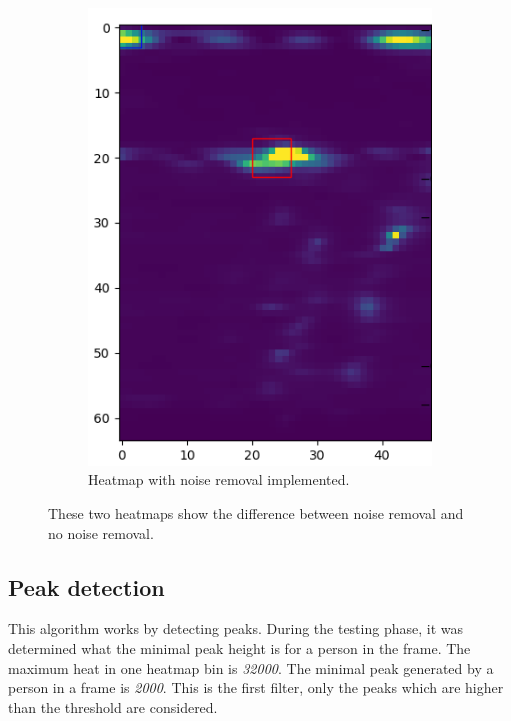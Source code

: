 \begin{figure}[t]
\begin{subfigure}{.45\textwidth}
  \includegraphics[width=.9\linewidth]{figures/people_detection/heatmap_with_filtering_crop.png}  
  \caption{Heatmap with noise removal implemented.}
  \label{fig:noise_removal}
\end{subfigure}
\caption{These two heatmaps show the difference between noise removal and no noise removal.}
\label{fig:noise_vs_no_noise}
\end{figure}

\subsection{Peak detection}
This algorithm works by detecting peaks. During the testing phase, it was determined what the minimal peak height is for a person in the frame. The maximum heat in one heatmap bin is \emph{32000}. The minimal peak generated by a person in a frame is \emph{2000}. This is the first filter, only the peaks which are higher than the threshold are considered.


